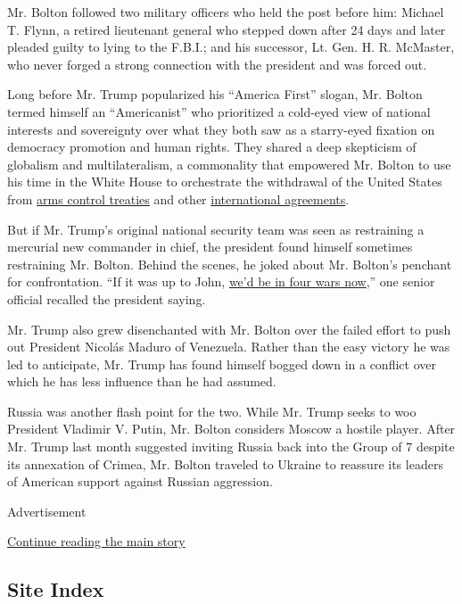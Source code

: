 Mr. Bolton followed two military officers who held the post before him:
Michael T. Flynn, a retired lieutenant general who stepped down after 24
days and later pleaded guilty to lying to the F.B.I.; and his successor,
Lt. Gen. H. R. McMaster, who never forged a strong connection with the
president and was forced out.

Long before Mr. Trump popularized his ``America First'' slogan, Mr.
Bolton termed himself an ``Americanist'' who prioritized a cold-eyed
view of national interests and sovereignty over what they both saw as a
starry-eyed fixation on democracy promotion and human rights. They
shared a deep skepticism of globalism and multilateralism, a commonality
that empowered Mr. Bolton to use his time in the White House to
orchestrate the withdrawal of the United States from
\href{https://www.nytimes3xbfgragh.onion/2019/02/01/us/politics/trump-inf-nuclear-treaty.html}{arms
control treaties} and other
\href{https://www.nytimes3xbfgragh.onion/2018/10/03/world/middleeast/us-withdraws-treaty-iran.html}{international
agreements}.

But if Mr. Trump's original national security team was seen as
restraining a mercurial new commander in chief, the president found
himself sometimes restraining Mr. Bolton. Behind the scenes, he joked
about Mr. Bolton's penchant for confrontation. ``If it was up to John,
\href{https://www.nytimes3xbfgragh.onion/2019/05/16/world/middleeast/iran-war-donald-trump.html?module=inline}{we'd
be in four wars now},'' one senior official recalled the president
saying.

Mr. Trump also grew disenchanted with Mr. Bolton over the failed effort
to push out President Nicolás Maduro of Venezuela. Rather than the easy
victory he was led to anticipate, Mr. Trump has found himself bogged
down in a conflict over which he has less influence than he had assumed.

Russia was another flash point for the two. While Mr. Trump seeks to woo
President Vladimir V. Putin, Mr. Bolton considers Moscow a hostile
player. After Mr. Trump last month suggested inviting Russia back into
the Group of 7 despite its annexation of Crimea, Mr. Bolton traveled to
Ukraine to reassure its leaders of American support against Russian
aggression.

Advertisement

\protect\hyperlink{after-bottom}{Continue reading the main story}

\hypertarget{site-index}{%
\subsection{Site Index}\label{site-index}}

